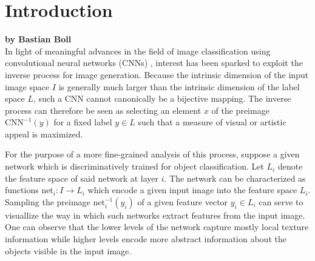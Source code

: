 
\section{Introduction}
\label{section:introduction}

\textbf{by Bastian Boll} \\

In light of meaningful advances in the field of image classification using convolutional neural networks (CNNs) \cite{vgg2014}, interest has been sparked to exploit the inverse process for image generation. Because the intrinsic dimension of the input image space \(I\) is generally much larger than the intrinsic dimension of the label space \(L\), such a CNN cannot canonically be a bijective mapping. The inverse process can therefore be seen as selecting an element \(x\) of the preimage \(\mathrm{CNN}^{-1}(y)\) for a fixed label \(y\in L\) such that a measure of visual or artistic appeal is maximized.

For the purpose of a more fine-grained analysis of this process, suppose a given network which is discriminatively trained for object classification. Let \(L_i\) denote the feature space of said network at layer \(i\). The network can be characterized as functions \(\text{net}_i\colon I \to L_i\) which encode a given input image into the feature space \(L_i\). Sampling the preimage \(\text{net}_i^{-1}(y_i)\) of a given feature vector \(y_i\in L_i\) can serve to visuallize the way in which such networks extract features from the input image. One can observe that the lower levels of the network capture mostly local texture information while higher levels encode more abstract information about the objects visible in the input image.


